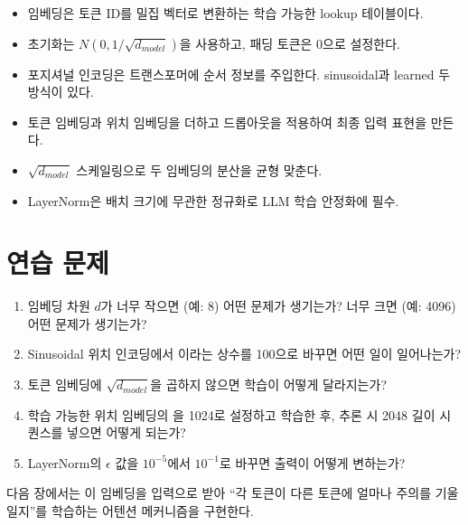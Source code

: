 \begin{itemize}
  \item 임베딩은 토큰 ID를 밀집 벡터로 변환하는 학습 가능한 lookup 테이블이다.
  \item 초기화는 $N(0, 1/\sqrt{d_{model}})$을 사용하고, 패딩 토큰은 0으로 설정한다.
  \item 포지셔널 인코딩은 트랜스포머에 순서 정보를 주입한다. sinusoidal과 learned 두 방식이 있다.
  \item 토큰 임베딩과 위치 임베딩을 더하고 드롭아웃을 적용하여 최종 입력 표현을 만든다.
  \item $\sqrt{d_{model}}$ 스케일링으로 두 임베딩의 분산을 균형 맞춘다.
  \item LayerNorm은 배치 크기에 무관한 정규화로 LLM 학습 안정화에 필수.
\end{itemize}

\section{연습 문제}

\begin{enumerate}
  \item 임베딩 차원 $d$가 너무 작으면 (예: 8) 어떤 문제가 생기는가? 너무 크면 (예: 4096) 어떤 문제가 생기는가?
  \item Sinusoidal 위치 인코딩에서 이라는 상수를 100으로 바꾸면 어떤 일이 일어나는가?
  \item 토큰 임베딩에 $\sqrt{d_{model}}$을 곱하지 않으면 학습이 어떻게 달라지는가?
  \item 학습 가능한 위치 임베딩의 을 1024로 설정하고 학습한 후, 추론 시 2048 길이 시퀀스를 넣으면 어떻게 되는가?
  \item LayerNorm의 $\epsilon$ 값을 $10^{-5}$에서 $10^{-1}$로 바꾸면 출력이 어떻게 변하는가?
\end{enumerate}

다음 장에서는 이 임베딩을 입력으로 받아 ``각 토큰이 다른 토큰에 얼마나 주의를 기울일지''를 학습하는 어텐션 메커니즘을 구현한다.
